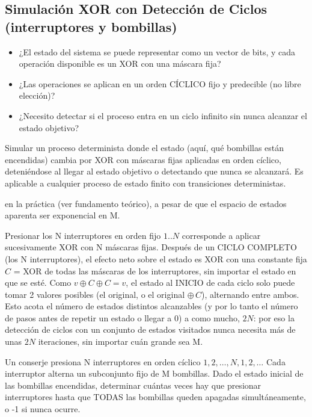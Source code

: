\subsection{Simulación XOR con Detección de Ciclos (interruptores y bombillas)}
\label{alg:7-5}


\begin{itemize}
\item ¿El estado del sistema se puede representar como un vector de bits, y cada operación disponible es un XOR con una máscara fija?
\item ¿Las operaciones se aplican en un orden CÍCLICO fijo y predecible (no libre elección)?
\item ¿Necesito detectar si el proceso entra en un ciclo infinito sin nunca alcanzar el estado objetivo?
\end{itemize}

 Simular un proceso determinista donde el estado (aquí, qué bombillas están encendidas) cambia por XOR con máscaras fijas aplicadas en orden cíclico, deteniéndose al llegar al estado objetivo o detectando que nunca se alcanzará. Es aplicable a cualquier proceso de estado finito con transiciones deterministas.

  en la práctica (ver fundamento teórico), a pesar de que el espacio de estados aparenta ser exponencial en M.

 Presionar los N interruptores en orden fijo $1..N$ corresponde a aplicar sucesivamente XOR con N máscaras fijas. Después de un CICLO COMPLETO (los N interruptores), el efecto neto sobre el estado es XOR con una constante fija $C$ = XOR de todas las máscaras de los interruptores, sin importar el estado en que se esté. Como $v \oplus C \oplus C = v$, el estado al INICIO de cada ciclo solo puede tomar 2 valores posibles (el original, o el original $\oplus\, C$), alternando entre ambos. Esto acota el número de estados distintos alcanzables (y por lo tanto el número de pasos antes de repetir un estado o llegar a 0) a como mucho, $2N$: por eso la detección de ciclos con un conjunto de estados visitados nunca necesita más de unas $2N$ iteraciones, sin importar cuán grande sea M.


Un conserje presiona N interruptores en orden cíclico $1,2,\ldots,N,1,2,\ldots$ Cada interruptor alterna un subconjunto fijo de M bombillas. Dado el estado inicial de las bombillas encendidas, determinar cuántas veces hay que presionar interruptores hasta que TODAS las bombillas queden apagadas simultáneamente, o -1 si nunca ocurre.

